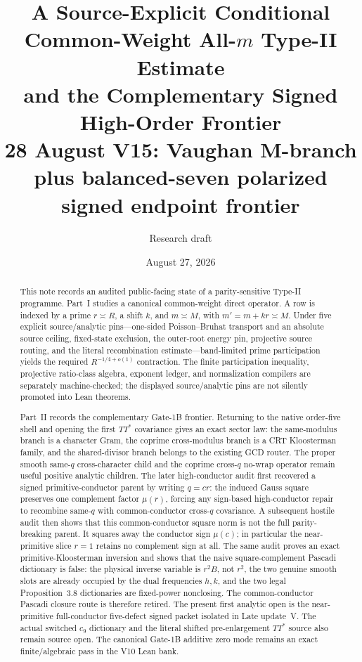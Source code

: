 \documentclass[11pt]{article}
\title{\textbf{A Source-Explicit Conditional Common-Weight All-$m$ Type-II Estimate\\
and the Complementary Signed High-Order Frontier}\\
\large 28 August V15: Vaughan M-branch plus balanced-seven polarized signed endpoint frontier}
\author{Research draft}
\date{August 27, 2026}
\theoremstyle{definition}
\newcommand{\1}{\mathbf 1}
\begin{document}
\maketitle



\begin{abstract}
This note records an audited public-facing state of a parity-sensitive Type-II
programme.  Part~I studies a canonical common-weight direct operator.  A row
is indexed by a prime $r\asymp R$, a shift $k$, and $m\asymp M$, with
$m'=m+kr\asymp M$.  Under five explicit source/analytic pins---one-sided
Poisson--Bruhat transport and an absolute source ceiling, fixed-state
exclusion, the outer-root energy pin, projective source routing, and the
literal recombination estimate---band-limited prime participation yields the
required $R^{-1/4+o(1)}$ contraction.  The finite participation inequality,
projective ratio-class algebra, exponent ledger, and normalization compilers
are separately machine-checked; the displayed source/analytic pins are not
silently promoted into Lean theorems.

Part~II records the complementary Gate-1B frontier.  Returning to the
native order-five shell and opening the first $TT^\ast$ covariance gives an
exact sector law: the same-modulus branch is a character Gram, the coprime
cross-modulus branch is a CRT Kloosterman family, and the shared-divisor branch
belongs to the existing GCD router.  The proper smooth same-$q$ cross-character
child and the coprime cross-$q$ no-wrap operator remain useful positive
analytic children.  The later high-conductor audit first recovered a signed
primitive-conductor parent by writing $q=cr$: the induced Gauss square preserves
one complement factor $\mu(r)$, forcing any sign-based high-conductor repair to
recombine same-$q$ with common-conductor cross-$q$ covariance.  A subsequent
hostile audit then shows that this common-conductor square norm is not the full
parity-breaking parent.  It squares away the conductor sign $\mu(c)$; in
particular the near-primitive slice $r=1$ retains no complement sign at all.
The same audit proves an exact primitive-Kloosterman inversion and shows that
the naive square-complement Pascadi dictionary is false: the physical inverse
variable is $r^2B$, not $r^2$, the two genuine smooth slots are already occupied
by the dual frequencies $h,k$, and the two legal Proposition~3.8 dictionaries
are fixed-power nonclosing.  The common-conductor Pascadi closure route is
therefore retired.  The present first analytic open is the near-primitive
full-conductor five-defect signed packet isolated in Late update~V.  The actual
switched $c_9$ dictionary and the literal shifted pre-enlargement $TT^\ast$
source also remain source open.  The canonical Gate-1B additive zero mode
remains an exact finite/algebraic pass in the V10 Lean bank.


\end{abstract}
\end{document}
